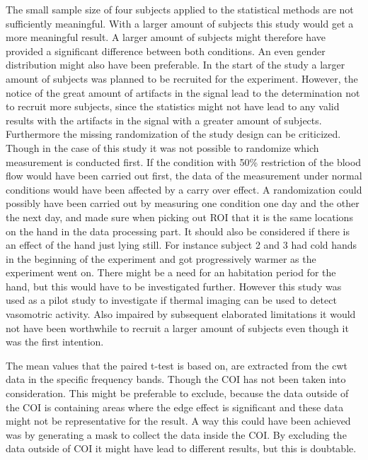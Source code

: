 The small sample size of four subjects applied to the statistical methods are not sufficiently meaningful. With a larger amount of subjects this study would get a more meaningful result. A larger amount of subjects might therefore have provided a significant difference between both conditions. An even gender distribution might also have been preferable. %
In the start of the study a larger amount of subjects was planned to be recruited for the experiment. However, the notice of the great amount of artifacts in the signal lead to the determination not to recruit more subjects, since the statistics might not have lead to any valid results with the artifacts in the signal with a greater amount of subjects.
Furthermore the missing randomization of the study design can be criticized. Though in the case of this study it was not possible to randomize which measurement is conducted first. If the condition with 50\% restriction of the blood flow would have been carried out first, the data of the measurement under normal conditions would have been affected by a carry over effect. A randomization could possibly have been carried out by measuring one condition one day and the other the next day, and made sure when picking out ROI that it is the same locations on the hand in the data processing part. It should also be considered if there is an effect of the hand just lying still. For instance subject 2 and 3 had cold hands in the beginning of the experiment and got progressively warmer as the experiment went on. There might be a need for an habitation period for the hand, but this would have to be investigated further. 
However this study was used as a pilot study to investigate if thermal imaging can be used to detect vasomotric activity. Also impaired by subsequent elaborated limitations it would not have been worthwhile to recruit a larger amount of subjects even though it was the first intention.

The mean values that the paired t-test is based on, are extracted from the cwt data in the specific frequency bands. Though the COI has not been taken into consideration. This might be preferable to exclude, because the data outside of the COI is containing areas where the edge effect is significant and these data might not be representative for the result. A way this could have been achieved was by generating a mask to collect the data inside the COI. By excluding the data outside of COI it might have lead to different results, but this is doubtable. 


